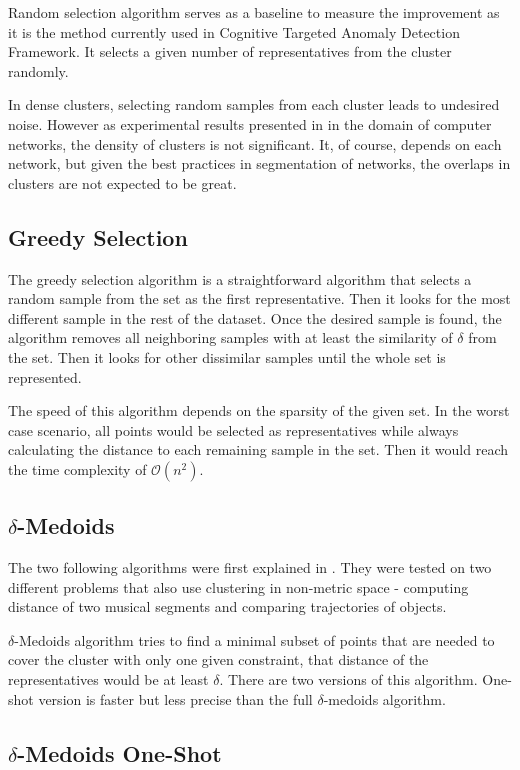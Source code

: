 \documentclass[thesis=B,english]{FITthesis}[2012/10/20]
\begin{document}
Random selection algorithm serves as a baseline to measure the improvement as it is the method currently used in Cognitive Targeted Anomaly Detection Framework.
It selects a given number of representatives from the cluster randomly.

In dense clusters, selecting random samples from each cluster leads to undesired noise.
However as experimental results presented in \cite{kopp2018community} in the domain of computer networks, the density of clusters is not significant.
It, of course, depends on each network, but given the best practices in segmentation of networks, the overlaps in clusters are not expected to be great.

\subsection{Greedy Selection}\label{subsec:greedy_select}
The greedy selection algorithm is a straightforward algorithm that selects a random sample from the set as the first representative.
Then it looks for the most different sample in the rest of the dataset.
Once the desired sample is found, the algorithm removes all neighboring samples with at least the similarity of $\delta$ from the set.
Then it looks for other dissimilar samples until the whole set is represented.

The speed of this algorithm depends on the sparsity of the given set.
In the worst case scenario, all points would be selected as representatives while always calculating the distance to each remaining sample in the set. Then it would reach the time complexity of $\mathcal{O}(n^2)$.

\subsection{$\delta$-Medoids}\label{subsec:delta_medoids}
The two following algorithms were first explained in \cite{liebman2015representative}.
They were tested on two different problems that also use clustering in non-metric space - computing distance of two musical segments and comparing trajectories of objects.

$\delta$-Medoids algorithm tries to find a minimal subset of points that are needed to cover the cluster with only one given constraint, that distance of the representatives would be at least $\delta$.
There are two versions of this algorithm.
One-shot version is faster but less precise than the full $\delta$-medoids algorithm.

\subsection{$\delta$-Medoids One-Shot}
\end{document}

